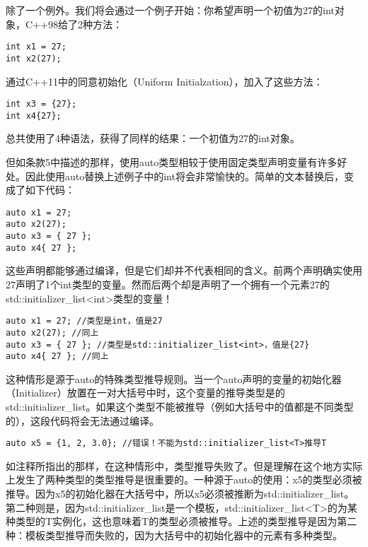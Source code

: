 除了一个例外。我们将会通过一个例子开始：你希望声明一个初值为27的int对象，C++98给了2种方法：

\begin{lstlisting}
int x1 = 27;
int x2(27);
\end{lstlisting}

通过C++11中的同意初始化（Uniform Initialzation），加入了这些方法：

\begin{lstlisting}
int x3 = {27};
int x4{27};
\end{lstlisting}

总共使用了4种语法，获得了同样的结果：一个初值为27的int对象。

但如条款5中描述的那样，使用auto类型相较于使用固定类型声明变量有许多好处。因此使用auto替换上述例子中的int将会非常愉快的。简单的文本替换后，变成了如下代码：

\begin{lstlisting}
auto x1 = 27;
auto x2(27);
auto x3 = { 27 };
auto x4{ 27 };
\end{lstlisting}

这些声明都能够通过编译，但是它们却并不代表相同的含义。前两个声明确实使用27声明了1个int类型的变量。然而后两个却是声明了一个拥有一个元素27的std::initializer\_list<int>类型的变量！

\begin{lstlisting}
auto x1 = 27; //类型是int，值是27
auto x2(27); //同上
auto x3 = { 27 }; //类型是std::initializer_list<int>，值是{27}
auto x4{ 27 }; //同上
\end{lstlisting}

这种情形是源于auto的特殊类型推导规则。当一个auto声明的变量的初始化器（Initializer）放置在一对大括号中时，这个变量的推导类型是的std::initializer\_list。如果这个类型不能被推导（例如大括号中的值都是不同类型的），这段代码将会无法通过编译。

\begin{lstlisting}
auto x5 = {1, 2, 3.0}; //错误！不能为std::initializer_list<T>推导T
\end{lstlisting}

如注释所指出的那样，在这种情形中，类型推导失败了。但是理解在这个地方实际上发生了两种类型的类型推导是很重要的。一种源于auto的使用：x5的类型必须被推导。因为x5的初始化器在大括号中，所以x5必须被推断为std::initializer\_list。第二种则是，因为std::initializer\_list是一个模板，std::initializer\_list<T>的为某种类型的T实例化，这也意味着T的类型必须被推导。上述的类型推导是因为第二种：模板类型推导而失败的，因为大括号中的初始化器中的元素有多种类型。

